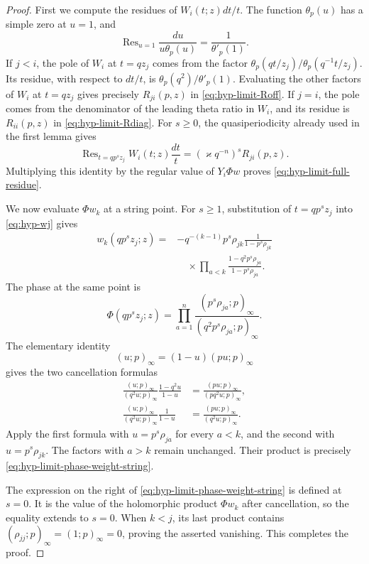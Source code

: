 \documentclass[12pt]{amsart}
\theoremstyle{definition}
\numberwithin{equation}{section}
\theoremstyle{definition}
\let\tht\theta
\let\ge\geqslant
\let\on\operatorname
\def\Res{\on{Res}}
\def\beq{\begin{equation}}
\def\eeq{\end{equation}}
\begin{document}
\begin{proof}
First we compute the residues of $W_i(t;z)dt/t$.
The function $\tht_p(u)$ has a simple zero at $u=1$,
and
\[
 \Res_{u=1}\frac{du}{u\tht_p(u)}
 =\frac1{\tht'_p(1)}.
\]
If $j<i$, the pole of $W_i$ at $t=qz_j$ comes from the
factor $\tht_p(qt/z_j)/\tht_p(q^{-1}t/z_j)$.
Its residue, with respect to $dt/t$, is
$\tht_p(q^2)/\tht'_p(1)$. Evaluating the other factors
of $W_i$ at $t=qz_j$ gives precisely
$R_{ji}(p,z)$ in \eqref{eq:hyp-limit-Roff}.
If $j=i$, the pole comes from the denominator of the
leading theta ratio in $W_i$, and its residue is
$R_{ii}(p,z)$ in \eqref{eq:hyp-limit-Rdiag}.
For $s\ge0$, the quasiperiodicity already used in the
first lemma gives
\beq\label{eq:hyp-limit-residue-W}
 \Res_{t=qp^sz_j}W_i(t;z)\frac{dt}{t}
 =(\varkappa q^{-n})^s R_{ji}(p,z).
\eeq
Multiplying this identity by the regular value of
$Y_i\Phi w$ proves \eqref{eq:hyp-limit-full-residue}.

We now evaluate $\Phi w_k$ at a string point. For $s\ge1$,
substitution of $t=qp^sz_j$ into \eqref{eq:hyp-wj}
gives
\beq\label{eq:hyp-limit-w-on-string}
 \begin{aligned}
 w_k(qp^sz_j;z)
 ={}&-q^{-(k-1)}p^s\rho_{jk}
 \frac1{1-p^s\rho_{jk}}\\
 &\quad\times\prod_{a<k}
   \frac{1-q^2p^s\rho_{ja}}{1-p^s\rho_{ja}}.
 \end{aligned}
\eeq
The phase at the same point is
\[
 \Phi(qp^sz_j;z)=\prod_{a=1}^n
 \frac{(p^s\rho_{ja};p)_\infty}
      {(q^2p^s\rho_{ja};p)_\infty}.
\]
The elementary identity
\[
 (u;p)_\infty=(1-u)(pu;p)_\infty
\]
gives the two cancellation formulas
\[
 \begin{aligned}
 \frac{(u;p)_\infty}{(q^2u;p)_\infty}
 \frac{1-q^2u}{1-u}
 &=\frac{(pu;p)_\infty}{(pq^2u;p)_\infty},\\
 \frac{(u;p)_\infty}{(q^2u;p)_\infty}
 \frac1{1-u}
 &=\frac{(pu;p)_\infty}{(q^2u;p)_\infty}.
 \end{aligned}
\]
Apply the first formula with $u=p^s\rho_{ja}$ for
every $a<k$, and the second with $u=p^s\rho_{jk}$.
The factors with $a>k$ remain unchanged. Their product
is precisely \eqref{eq:hyp-limit-phase-weight-string}.

The expression on the right of
\eqref{eq:hyp-limit-phase-weight-string} is defined at
$s=0$. It is the value of the holomorphic product
$\Phi w_k$ after cancellation, so the equality extends
to $s=0$. When $k<j$, its last product contains
$(\rho_{jj};p)_\infty=(1;p)_\infty=0$, proving the
asserted vanishing. This completes the proof.
\end{proof}
\end{document}
